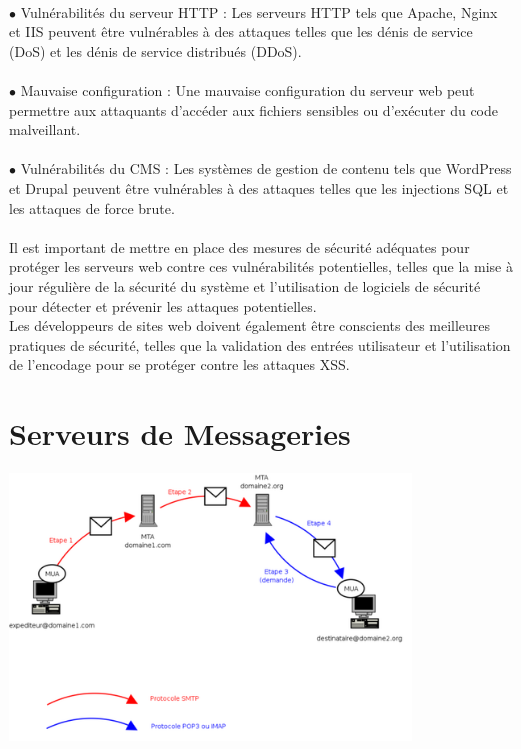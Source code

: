 \paragraph{ }
$\bullet$ Vulnérabilités du serveur HTTP : Les serveurs HTTP tels que Apache, Nginx et IIS peuvent être vulnérables à des attaques telles que les dénis de service (DoS) et les dénis de service distribués (DDoS).
\paragraph{ }
$\bullet$ Mauvaise configuration : Une mauvaise configuration du serveur web peut permettre aux attaquants d'accéder aux fichiers sensibles ou d'exécuter du code malveillant.
\paragraph{ }
$\bullet$ Vulnérabilités du CMS : Les systèmes de gestion de contenu tels que WordPress et Drupal peuvent être vulnérables à des attaques telles que les injections SQL et les attaques de force brute.\\
\paragraph{ }
Il est important de mettre en place des mesures de sécurité adéquates pour protéger les serveurs web contre ces vulnérabilités potentielles, telles que la mise à jour régulière de la sécurité du système et l'utilisation de logiciels de sécurité pour détecter et prévenir les attaques potentielles. \\Les développeurs de sites web doivent également être conscients des meilleures pratiques de sécurité, telles que la validation des entrées utilisateur et l'utilisation de l'encodage pour se protéger contre les attaques XSS.\\


\section{Serveurs de Messageries}
\vspace{4mm}
\paragraph{
	\includegraphics[width=0.8\textwidth]{PhotoMemoire/Serveur_Messagerie.png}}
